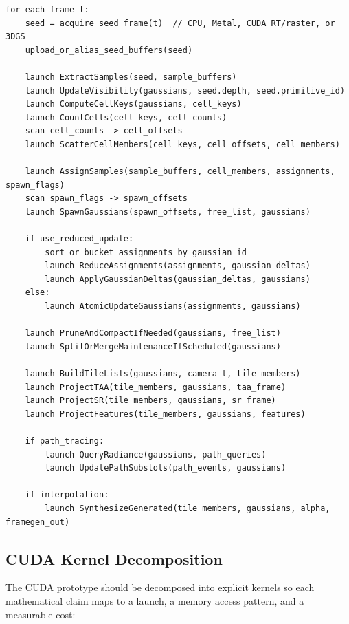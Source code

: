 \documentclass[11pt]{article}
\begin{document}
\begin{verbatim}
for each frame t:
    seed = acquire_seed_frame(t)  // CPU, Metal, CUDA RT/raster, or 3DGS
    upload_or_alias_seed_buffers(seed)

    launch ExtractSamples(seed, sample_buffers)
    launch UpdateVisibility(gaussians, seed.depth, seed.primitive_id)
    launch ComputeCellKeys(gaussians, cell_keys)
    launch CountCells(cell_keys, cell_counts)
    scan cell_counts -> cell_offsets
    launch ScatterCellMembers(cell_keys, cell_offsets, cell_members)

    launch AssignSamples(sample_buffers, cell_members, assignments, spawn_flags)
    scan spawn_flags -> spawn_offsets
    launch SpawnGaussians(spawn_offsets, free_list, gaussians)

    if use_reduced_update:
        sort_or_bucket assignments by gaussian_id
        launch ReduceAssignments(assignments, gaussian_deltas)
        launch ApplyGaussianDeltas(gaussian_deltas, gaussians)
    else:
        launch AtomicUpdateGaussians(assignments, gaussians)

    launch PruneAndCompactIfNeeded(gaussians, free_list)
    launch SplitOrMergeMaintenanceIfScheduled(gaussians)

    launch BuildTileLists(gaussians, camera_t, tile_members)
    launch ProjectTAA(tile_members, gaussians, taa_frame)
    launch ProjectSR(tile_members, gaussians, sr_frame)
    launch ProjectFeatures(tile_members, gaussians, features)

    if path_tracing:
        launch QueryRadiance(gaussians, path_queries)
        launch UpdatePathSubslots(path_events, gaussians)

    if interpolation:
        launch SynthesizeGenerated(tile_members, gaussians, alpha, framegen_out)
\end{verbatim}

\subsection{CUDA Kernel Decomposition}

The CUDA prototype should be decomposed into explicit kernels so each
mathematical claim maps to a launch, a memory access pattern, and a measurable
cost:
\end{document}
